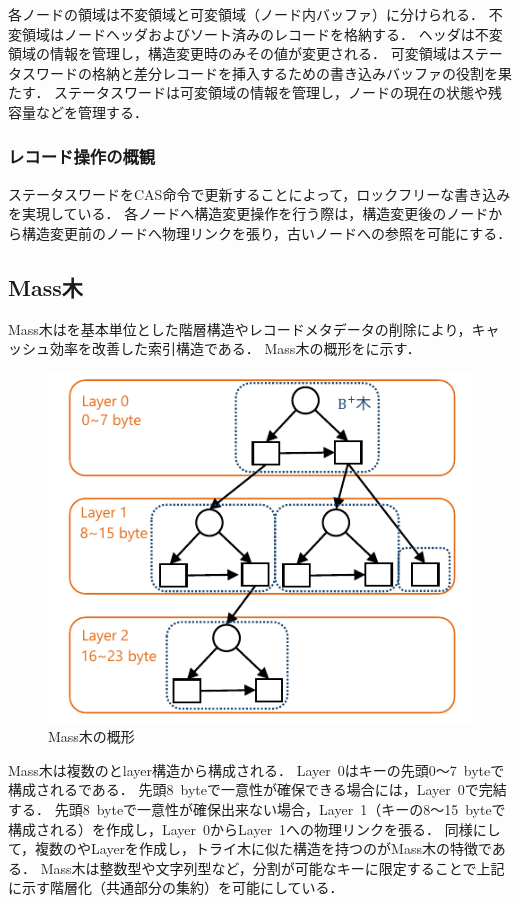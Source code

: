 各ノードの領域は不変領域と可変領域（ノード内バッファ）に分けられる．
不変領域はノードヘッダおよびソート済みのレコードを格納する．
ヘッダは不変領域の情報を管理し，構造変更時のみその値が変更される．
可変領域はステータスワードの格納と差分レコードを挿入するための書き込みバッファの役割を果たす．
ステータスワードは可変領域の情報を管理し，ノードの現在の状態や残容量などを管理する．

\subsubsection{レコード操作の概観}
ステータスワードをCAS命令で更新することによって，ロックフリーな書き込みを実現している．
各ノードへ構造変更操作を行う際は，構造変更後のノードから構造変更前のノードへ物理リンクを張り，古いノードへの参照を可能にする．

\subsection{Mass木}
Mass木は\Bptree{}を基本単位とした階層構造やレコードメタデータの削除により，キャッシュ効率を改善した索引構造である．
Mass木の概形を\Fig{\ref{fig:masstree}}に示す．

\begin{figure}[t]
    \centering
    \includegraphics{./figures/masstree.pdf}
    \caption{Mass木の概形}
    \label{fig:masstree}
\end{figure}

Mass木は複数の\Bptree{}とlayer構造から構成される．
Layer~0はキーの先頭0～7~byteで構成される\Bptree{}である．
先頭8~byteで一意性が確保できる場合には，Layer~0で完結する．
先頭8~byteで一意性が確保出来ない場合，Layer~1（キーの8～15~byteで構成される\Bptree{}）を作成し，Layer~0からLayer~1への物理リンクを張る．
同様にして，複数の\Bptree{}やLayerを作成し，トライ木に似た構造を持つのがMass木の特徴である．
Mass木は整数型や文字列型など，分割が可能なキーに限定することで上記に示す階層化（共通部分の集約）を可能にしている．

